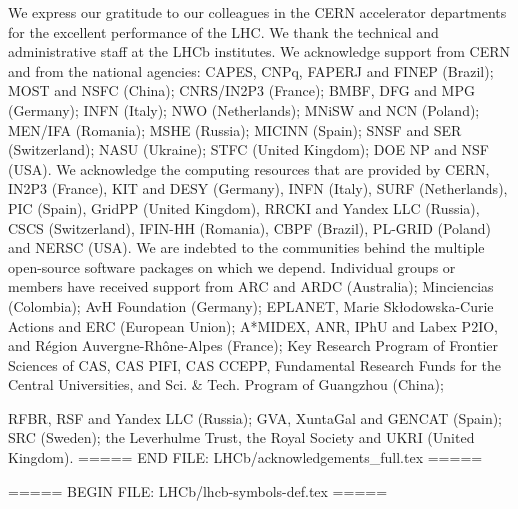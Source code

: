 \noindent We express our gratitude to our colleagues in the CERN
accelerator departments for the excellent performance of the LHC. We
thank the technical and administrative staff at the LHCb
institutes.
We acknowledge support from CERN and from the national agencies:
CAPES, CNPq, FAPERJ and FINEP (Brazil);
MOST and NSFC (China);
CNRS/IN2P3 (France);
BMBF, DFG and MPG (Germany);
INFN (Italy);
NWO (Netherlands);
MNiSW and NCN (Poland);
MEN/IFA (Romania);
MSHE (Russia);
MICINN (Spain);
SNSF and SER (Switzerland);
NASU (Ukraine);
STFC (United Kingdom);
DOE NP and NSF (USA).
We acknowledge the computing resources that are provided by CERN, IN2P3
(France), KIT and DESY (Germany), INFN (Italy), SURF (Netherlands),
PIC (Spain), GridPP (United Kingdom), RRCKI and Yandex
LLC (Russia), CSCS (Switzerland), IFIN-HH (Romania), CBPF (Brazil),
PL-GRID (Poland) and NERSC (USA).
We are indebted to the communities behind the multiple open-source
software packages on which we depend.
Individual groups or members have received support from
ARC and ARDC (Australia);
Minciencias (Colombia);
AvH Foundation (Germany);
EPLANET, Marie Sk\l{}odowska-Curie Actions and ERC (European Union);
A*MIDEX, ANR, IPhU and Labex P2IO, and R\'{e}gion Auvergne-Rh\^{o}ne-Alpes (France);
Key Research Program of Frontier Sciences of CAS, CAS PIFI, CAS CCEPP,
Fundamental Research Funds for the Central Universities,
and Sci. \& Tech. Program of Guangzhou (China);


RFBR, RSF and Yandex LLC (Russia);
GVA, XuntaGal and GENCAT (Spain);
SRC (Sweden);
the Leverhulme Trust, the Royal Society
 and UKRI (United Kingdom).
===== END FILE: LHCb/acknowledgements_full.tex =====

===== BEGIN FILE: LHCb/lhcb-symbols-def.tex =====























\usepackage{xspace}
\usepackage{upgreek}



















